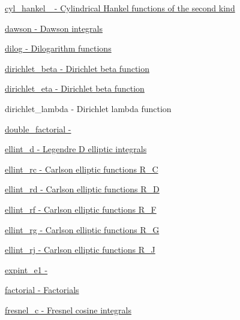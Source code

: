\begin{DoxyItemize}
\item \hyperlink{group__gnu__math__spec__func_ga307fd77aa8f0ed2028a9fab88976ca54}{cyl\+\_\+hankel\+\_ -\/ Cylindrical Hankel functions of the second kind}
\item \hyperlink{group__gnu__math__spec__func_ga30e46cb24428cfdb858c52fec431dee4}{dawson -\/ Dawson integrals}
\item \hyperlink{group__gnu__math__spec__func_ga8fceba3ecc618971e0e3c089d8dc49cf}{dilog -\/ Dilogarithm functions}
\item \hyperlink{group__gnu__math__spec__func_ga87466a2d429a2815d794acc21c882b08}{dirichlet\+\_\+beta -\/ Dirichlet beta function}
\item \hyperlink{group__gnu__math__spec__func_gae46e26e4107675d285c79a2d6202e6c7}{dirichlet\+\_\+eta -\/ Dirichlet beta function}
\item dirichlet\+\_\+lambda -\/ Dirichlet lambda function
\item \hyperlink{group__gnu__math__spec__func_ga206cdf1ae7f9a0df3048af18892b8ba8}{double\+\_\+factorial -\/ }
\item \hyperlink{group__gnu__math__spec__func_ga6a594ffefbe4f238f98fa2190b03795f}{ellint\+\_\+d -\/ Legendre D elliptic integrals}
\item \hyperlink{group__gnu__math__spec__func_ga183d78859b56f93237567e6322164832}{ellint\+\_\+rc -\/ Carlson elliptic functions R\+\_\+\+C}
\item \hyperlink{group__gnu__math__spec__func_ga812c4f543575006c6b555d1385b88d90}{ellint\+\_\+rd -\/ Carlson elliptic functions R\+\_\+\+D}
\item \hyperlink{group__gnu__math__spec__func_gad276bd7533a87ca6d658cebc00a11b0a}{ellint\+\_\+rf -\/ Carlson elliptic functions R\+\_\+\+F}
\item \hyperlink{group__gnu__math__spec__func_ga9d3d53ace67dfa6126118fb780095a1f}{ellint\+\_\+rg -\/ Carlson elliptic functions R\+\_\+\+G}
\item \hyperlink{group__gnu__math__spec__func_ga61c6d7f5b930400eeb8de455667d4292}{ellint\+\_\+rj -\/ Carlson elliptic functions R\+\_\+\+J}
\item \hyperlink{group__gnu__math__spec__func_ga3696fc269b543a908d47bad7e98256e7}{expint\+\_\+e1 -\/ }
\item \hyperlink{group__gnu__math__spec__func_gafdb75898f433c95eec50d8effbf94fb4}{factorial -\/ Factorials}
\item \hyperlink{group__gnu__math__spec__func_ga7ecb0071ad3172d53276a967f9b702fc}{fresnel\+\_\+c -\/ Fresnel cosine integrals}

\end{DoxyItemize}
